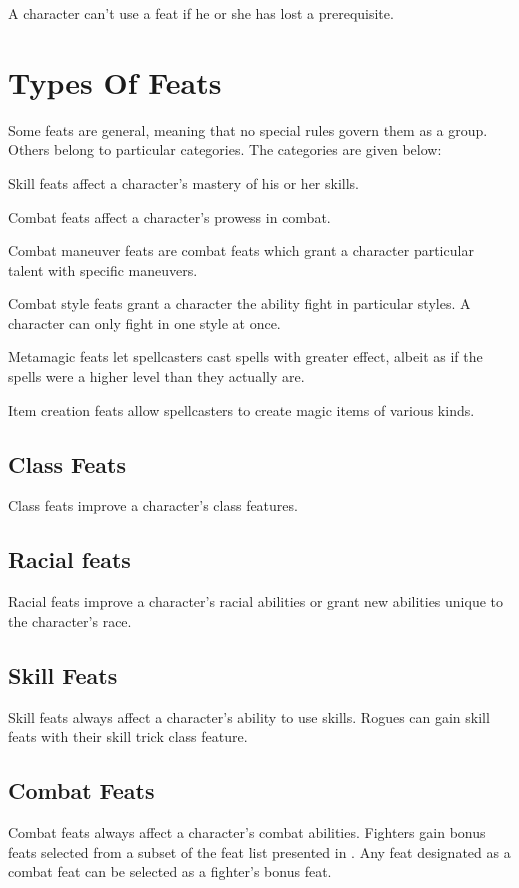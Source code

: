 A character can't use a feat if he or she has lost a prerequisite.

\section{Types Of Feats}
Some feats are general, meaning that no special rules govern
them as a group. Others belong to particular categories. The categories are given below:
\begin{itemize*}
\item Skill feats affect a character's mastery of his or her skills.
\item Combat feats affect a character's prowess in combat.
\item Combat maneuver feats are combat feats which grant a character particular talent with specific maneuvers.
\item Combat style feats grant a character the ability fight in particular styles. A character can only fight in one style at once.
\item Metamagic feats let spellcasters cast spells with greater effect, albeit as if the spells were a higher level than they actually are.
\item Item creation feats allow spellcasters to create magic items of various kinds.
\end{itemize*}

\subsection{Class Feats}
Class feats improve a character's class features.

\subsection{Racial feats}
Racial feats improve a character's racial abilities or grant new abilities unique to the character's race.

\subsection{Skill Feats}
Skill feats always affect a character's ability to use skills. Rogues can gain skill feats with their skill trick class feature.

\subsection{Combat Feats}
Combat feats always affect a character's combat abilities. Fighters gain bonus feats selected from a subset of the feat list presented in . Any feat designated as a combat feat can be selected as a fighter's bonus feat.

